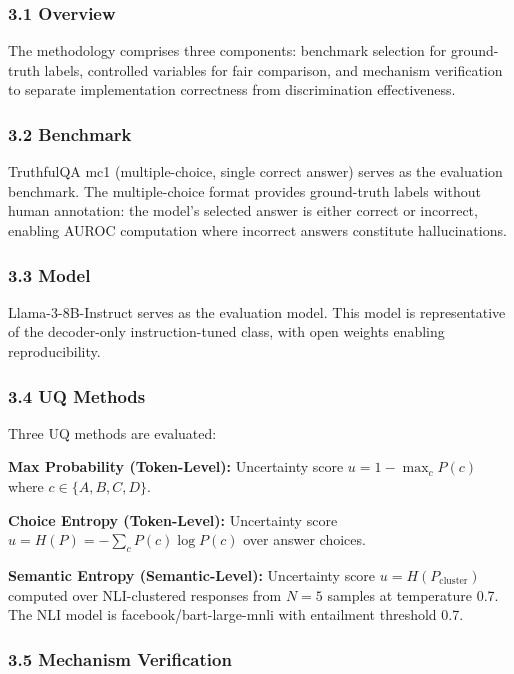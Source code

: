 
\subsubsection{3.1 Overview}

The methodology comprises three components: benchmark selection for ground-truth labels, controlled variables for fair comparison, and mechanism verification to separate implementation correctness from discrimination effectiveness.

\subsubsection{3.2 Benchmark}

TruthfulQA mc1 (multiple-choice, single correct answer) serves as the evaluation benchmark. The multiple-choice format provides ground-truth labels without human annotation: the model's selected answer is either correct or incorrect, enabling AUROC computation where incorrect answers constitute hallucinations.

\subsubsection{3.3 Model}

Llama-3-8B-Instruct serves as the evaluation model. This model is representative of the decoder-only instruction-tuned class, with open weights enabling reproducibility.

\subsubsection{3.4 UQ Methods}

Three UQ methods are evaluated:

\textbf{Max Probability (Token-Level):} Uncertainty score $u = 1 - \max_c P(c)$ where $c \in \{A, B, C, D\}$.

\textbf{Choice Entropy (Token-Level):} Uncertainty score $u = H(P) = -\sum_c P(c) \log P(c)$ over answer choices.

\textbf{Semantic Entropy (Semantic-Level):} Uncertainty score $u = H(P_{\text{cluster}})$ computed over NLI-clustered responses from $N=5$ samples at temperature 0.7. The NLI model is facebook/bart-large-mnli with entailment threshold 0.7.

\subsubsection{3.5 Mechanism Verification}

